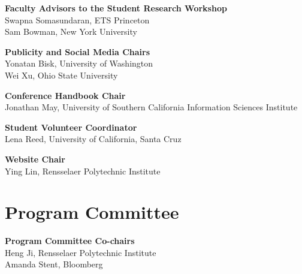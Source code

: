 {\bf Faculty Advisors to the Student Research Workshop} \\
Swapna Somasundaran, ETS Princeton\\
Sam Bowman, New York University

{\bf Publicity and Social Media Chairs} \\
Yonatan Bisk, University of Washington \\
Wei Xu, Ohio State University

{\bf Conference Handbook Chair} \\
Jonathan May, University of Southern California Information Sciences Institute

{\bf Student Volunteer Coordinator} \\
Lena Reed, University of California, Santa Cruz


{\bf Website Chair} \\
Ying Lin, Rensselaer Polytechnic Institute



\clearpage
\section{Program Committee}
\setlength{\parindent}{0pt}

\vspace*{0.5cm}

{\bf Program Committee Co-chairs} \\
Heng Ji, Rensselaer Polytechnic Institute\\
Amanda Stent, Bloomberg

